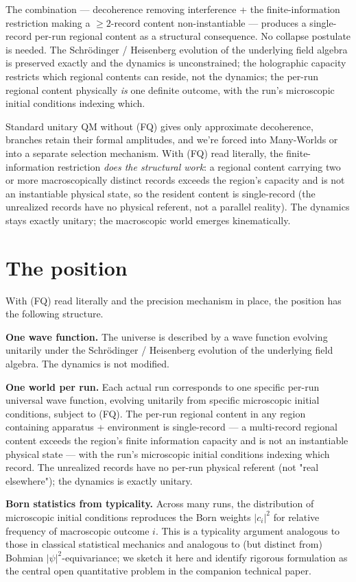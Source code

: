 \documentclass[11pt,a4paper]{article}
\begin{document}
The combination — decoherence removing interference + the finite-information restriction making a $\ge 2$-record content non-instantiable — produces a single-record per-run regional content as a structural consequence. No collapse postulate is needed. The Schrödinger / Heisenberg evolution of the underlying field algebra is preserved exactly and the dynamics is unconstrained; the holographic capacity restricts which regional contents can reside, not the dynamics; the per-run regional content physically \emph{is} one definite outcome, with the run's microscopic initial conditions indexing which.

Standard unitary QM without (FQ) gives only approximate decoherence, branches retain their formal amplitudes, and we're forced into Many-Worlds or into a separate selection mechanism. With (FQ) read literally, the finite-information restriction \emph{does the structural work}: a regional content carrying two or more macroscopically distinct records exceeds the region's capacity and is not an instantiable physical state, so the resident content is single-record (the unrealized records have no physical referent, not a parallel reality). The dynamics stays exactly unitary; the macroscopic world emerges kinematically.

\section{The position}

With (FQ) read literally and the precision mechanism in place, the position has the following structure.

\textbf{One wave function.} The universe is described by a wave function evolving unitarily under the Schrödinger / Heisenberg evolution of the underlying field algebra. The dynamics is not modified.

\textbf{One world per run.} Each actual run corresponds to one specific per-run universal wave function, evolving unitarily from specific microscopic initial conditions, subject to (FQ). The per-run regional content in any region containing apparatus + environment is single-record — a multi-record regional content exceeds the region's finite information capacity and is not an instantiable physical state — with the run's microscopic initial conditions indexing which record. The unrealized records have no per-run physical referent (not "real elsewhere"); the dynamics is exactly unitary.

\textbf{Born statistics from typicality.} Across many runs, the distribution of microscopic initial conditions reproduces the Born weights $|c_i|^2$ for relative frequency of macroscopic outcome $i$. This is a typicality argument analogous to those in classical statistical mechanics and analogous to (but distinct from) Bohmian $|\psi|^2$-equivariance; we sketch it here and identify rigorous formulation as the central open quantitative problem in the companion technical paper.
\end{document}
